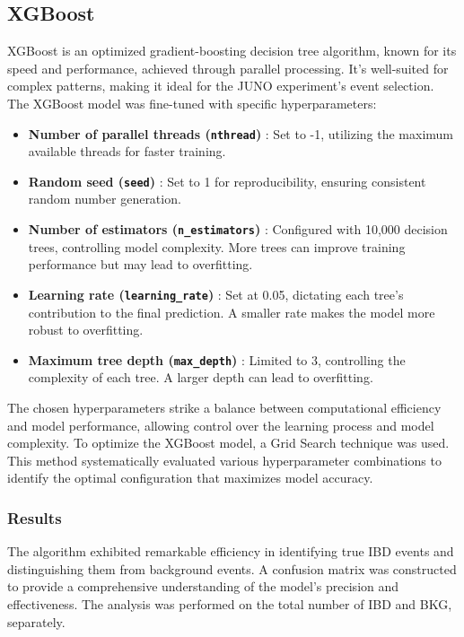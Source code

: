 \subsection{XGBoost}

XGBoost is an optimized gradient-boosting decision tree algorithm, known for its speed and performance, achieved through parallel processing. It's well-suited for complex patterns, making it ideal for the JUNO experiment's event selection.
The XGBoost model was fine-tuned with specific hyperparameters:

\begin{itemize}
	\item  \textbf{Number of parallel threads (\texttt{nthread})} :  Set to -1, utilizing the maximum available threads for faster training.
	\item  \textbf{Random seed (\texttt{seed})} : Set to 1 for reproducibility, ensuring consistent random number generation.
	\item  \textbf{Number of estimators (\texttt{n\_{estimators}})} : Configured with 10,000 decision trees, controlling model complexity. More trees can improve training performance but may lead to overfitting.
	\item  \textbf{Learning rate (\texttt{learning\_rate})} : Set at 0.05, dictating each tree's contribution to the final prediction. A smaller rate makes the model more robust to overfitting.
	\item  \textbf{Maximum tree depth (\texttt{max\_depth})} : Limited to 3, controlling the complexity of each tree. A larger depth can lead to overfitting.
\end{itemize}
The chosen hyperparameters strike a balance between computational efficiency and model performance, allowing control over the learning process and model complexity. To optimize the XGBoost model, a Grid Search technique was used. This method systematically evaluated various hyperparameter combinations to identify the optimal configuration that maximizes model accuracy.



\subsubsection{Results}
The algorithm exhibited remarkable efficiency in identifying true IBD events and distinguishing them from background events. A confusion matrix was constructed to provide a comprehensive understanding of the model's precision and effectiveness. The analysis was performed on the total number of IBD and BKG, separately.

